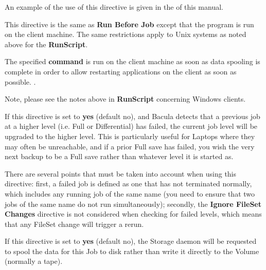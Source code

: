 \begin{description}
   An example of the use of this directive is given in the  
    of this manual.
  

\item [Client Run Before Job = \lt{}command\gt{}]
   This directive is the same as {\bf Run Before Job} except that the
   program is run on the client machine.  The same restrictions apply to
   Unix systems as noted above for the {\bf RunScript}.

\item [Client Run After Job = \lt{}command\gt{}]
   The specified {\bf command} is run on the client machine as soon
   as data spooling is complete in order to allow restarting applications
   on the client as soon as possible. .

   Note, please see the notes above in {\bf RunScript} 
   concerning Windows clients.

\item [Rerun Failed Levels = \lt{}yes\vb{}no\gt{}]
   If this directive is set to {\bf yes} (default no), and Bacula detects that
   a previous job at a higher level (i.e.  Full or Differential) has failed,
   the current job level will be upgraded to the higher level.  This is
   particularly useful for Laptops where they may often be unreachable, and if
   a prior Full save has failed, you wish the very next backup to be a Full
   save rather than whatever level it is started as.

   There are several points that must be taken into account when using this
   directive: first, a failed job is defined as one that has not terminated
   normally, which includes any running job of the same name (you need to
   ensure that two jobs of the same name do not run simultaneously);
   secondly, the {\bf Ignore FileSet Changes} directive is not considered 
   when checking for failed levels, which means that any FileSet change will
   trigger a rerun.

\item [Spool Data = \lt{}yes\vb{}no\gt{}]

   If this directive is set  to {\bf yes} (default no), the Storage daemon will
   be requested  to spool the data for this Job to disk rather than write it 
   directly to the Volume (normally a tape). 


\end{description}
